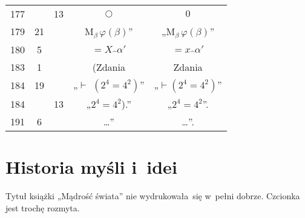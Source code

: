 \documentclass[a4paper,11pt]{article}
\begin{document}
\begin{center}
\begin{tabular}{|c|c|c|c|c|}
    177 & & 13 & $\bigcirc$ & $0$ \\
    179 & 21 & & $\textrm{M}_{ \beta }\, \varphi( \beta )$”
           & „$\textrm{M}_{ \beta }\, \varphi( \beta )$” \\
    180 &  5 & & $=\!\! X \hat{ \;\, } \alpha'$
           & $= x \hat{ \;\, } \alpha'$ \\
    183 &  1 & & (Zdania & Zdania \\
    184 & 19 & & „$\vdash$ $( 2^{ 4 } = 4^{ 2 })$”
           & „$\vdash$$( 2^{ 4 } = 4^{ 2 })$” \\
    184 & & 13 & „$2^{ 4 } = 4^{2}$).” & „$2^{ 4 } = 4^{2}$”. \\
    191 &  6 & & \ldots” & \ldots”. \\
    \hline
  \end{tabular}

\end{center}

\vspace{\spaceTwo}













\newpage

\section{Historia myśli i~idei}

\vspace{\spaceTwo}




\vspace{0em}



\vspace{0em}


\noindent
{} Tytuł książki „Mądrość świata” nie wydrukowała~się
w~pełni dobrze. Czcionka jest trochę rozmyta.

\vspace{\spaceFour}
\end{document}
